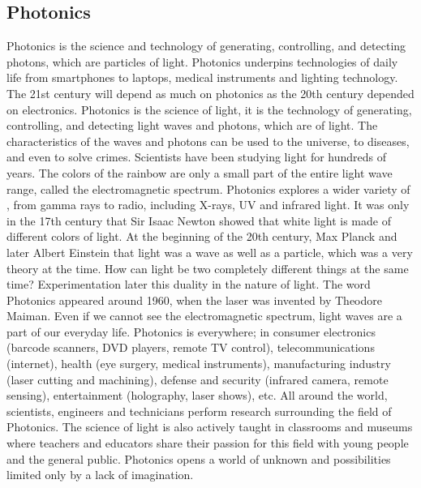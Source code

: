 \subsection*{Photonics}
Photonics is the science and technology of generating, controlling, and detecting
photons, which are particles of light. Photonics underpins technologies of daily life
from smartphones to laptops, medical instruments and lighting technology. The 21st
century will depend as much on photonics as the 20th century depended on electronics.
Photonics is the science of light, it is the technology of generating, controlling, and
detecting light waves and photons, which are \underline{\hspace{2cm}}
of light. The characteristics of the waves and photons can be used to 
\underline{\hspace{2cm}} the universe, to \underline{\hspace{2cm}}
diseases, and even to solve crimes. Scientists have been studying light for hundreds
of years. The colors of the rainbow are only a small part of the entire light wave
range, called the electromagnetic spectrum. Photonics explores a wider variety of
\underline{\hspace{2cm}}, from gamma rays to radio, including X-rays,
UV and infrared light. It was only in the 17th century that Sir Isaac Newton showed
that white light is made of different colors of light. At the beginning of the 20th
century, Max Planck and later Albert Einstein \underline{\hspace{2cm}}
that light was a wave as well as a particle, which was a very 
\underline{\hspace{1.5cm}} theory at the time. How can light be two completely
different things at the same time? Experimentation later 
\underline{\hspace{2cm}} this duality in the nature of light. The word Photonics
appeared around 1960, when the laser was invented by Theodore Maiman. Even if we
cannot see the \underline{\hspace{1.3cm}} electromagnetic spectrum,
\underline{\hspace{2cm}} light waves are a part of our everyday life.
Photonics is everywhere; in consumer electronics (barcode scanners, DVD players, remote
TV control), telecommunications (internet), health (eye surgery, medical instruments),
manufacturing industry (laser cutting and machining), defense and security (infrared
camera, remote sensing), entertainment (holography, laser shows), etc. All around the
world, scientists, engineers and technicians perform 
\underline{\hspace{2cm}} research surrounding the field of Photonics. The science of
light is also actively taught in classrooms and museums where teachers and educators
share their passion for this field with young people and the general public. Photonics
opens a world of unknown and \underline{\hspace{2cm}} possibilities
limited only by a lack of imagination.

